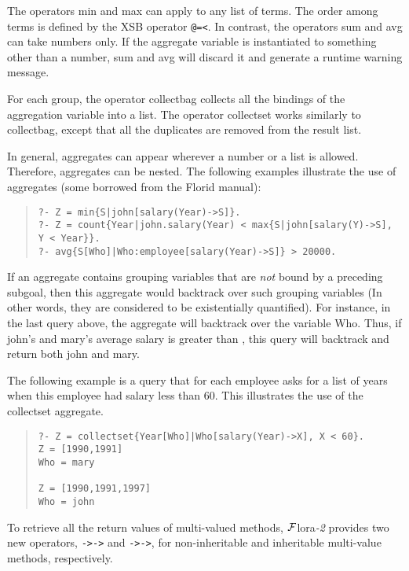 \documentclass[11pt]{article}
\newcommand{\FLORA}{{\mbox{${\cal F}${\sc lora}\rm\emph{-2}}}\xspace}
\newcommand{\FLORID}{{\mbox{\sc Florid}}\xspace}
\begin{document}
The operators {\sf min} and {\sf max} can apply to any list of
terms. The order among terms is defined by the XSB operator {\tt @=<}.  In
contrast, the operators {\sf sum} and {\sf avg} can take numbers only. If
the aggregate variable is instantiated to something other than a
number, {\sf sum} and {\sf avg} will discard it and generate a runtime
warning message.

For each group, the operator {\sf collectbag} collects all the bindings of
the aggregation variable into a list. The operator {\sf collectset} works
similarly to {\sf collectbag}, except that all the duplicates are removed
from the result list.

In general, aggregates can appear wherever a number or a list is
allowed. Therefore, aggregates can be nested. The following examples
illustrate the use of aggregates (some borrowed from the \FLORID manual):
\begin{quote}
\begin{verbatim}
?- Z = min{S|john[salary(Year)->S]}.
?- Z = count{Year|john.salary(Year) < max{S|john[salary(Y)->S], Y < Year}}.
?- avg{S[Who]|Who:employee[salary(Year)->S]} > 20000. 
\end{verbatim}
\end{quote}
If an aggregate contains grouping variables that are \emph{not} bound
by a preceding subgoal, then this aggregate would backtrack over such
grouping variables (In other words, they are considered to be
existentially quantified). For instance, in the last query above, the
aggregate will backtrack over the variable {\sf Who}. Thus, if
{\sf john}'s and {\sf mary}'s average salary is greater than {},
this query will backtrack and return both {\sf john} and {\sf mary}.

The following example is a query that for each employee asks for a list of
years when this employee had salary less than 60. This illustrates the use
of the {\sf collectset} aggregate.
\begin{quote}
\begin{verbatim}
?- Z = collectset{Year[Who]|Who[salary(Year)->X], X < 60}.
Z = [1990,1991]
Who = mary

Z = [1990,1991,1997]
Who = john
\end{verbatim}
\end{quote}

%
To retrieve all the return values of multi-valued methods, \FLORA provides
two new operators, {\tt ->->} and {\tt *->->}, for non-inheritable and
inheritable multi-value methods, respectively. 
\end{document}
